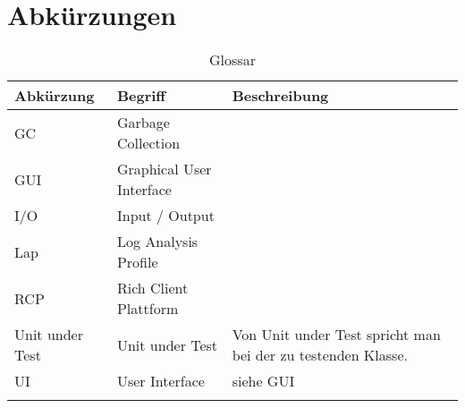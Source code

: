 \chapter*{Abkürzungen}\label{abkuerzungen}
  \begin{longtable}{|p{3cm}|p{5cm}|p{6cm}|}
\hline
  \textbf{Abkürzung} &\textbf{Begriff} &  \textbf{Beschreibung} \\\hline
  GC & Garbage Collection & \\\hline
GUI & Graphical User Interface & \\\hline
I/O & Input / Output & \\\hline
Lap & Log Analysis Profile & \\\hline
RCP & Rich Client Plattform &\\\hline
Unit under Test & Unit under Test & Von Unit under Test spricht man bei der zu testenden Klasse.\\\hline
UI & User Interface & siehe GUI \\\hline
      \caption{Glossar}\\
  \end{longtable}



